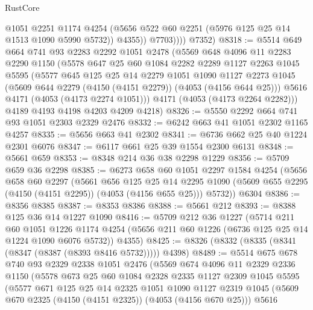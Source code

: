 \begin{lexlean}{RustCore}
\begin{coremodule}
                  @1051
                  @2251
                  @1174
                  @4254
                  (@5656 @522 @60 @2251 (@5976 @125 @25 @14 @1513 @1090 @5990 @5732))
                  @4355))
              @7703))))
      @7352)
@8318 := @5514
    @649
    @664
    @741
    @93
    @2283
    @2292
    @1051
    @2478
    (@5569
      @648
      @4096
      @11
      @2283
      @2290
      @1150
      (@5578
        @647
        @25
        @60
        @1084
        @2282
        @2289
        @1127
        @2263
        @1045
        @5595
        (@5577
          @645
          @125
          @25
          @14
          @2279
          @1051
          @1090
          @1127
          @2273
          @1045
          (@5609 @644 @2279 (@4150 (@4151 @2279)) (@4053 (@4156 @644 @25)))
          @5616
          @4171
          (@4053 (@4173 @2274 @1051)))
        @4171
        (@4053 (@4173 @2264 @2282)))
      @4189
      @4193
      @4198
      @4203
      @4209
      @4218)
@8326 := @5550 @2292 @664 @741 @93 @1051 @2303 @2329 @2476
@8332 := @6242 @663 @41 @1051 @2302 @1165 @4257
@8335 := @5656 @663 @41 @2302
@8341 := @6736 @662 @25 @40 @1224 @2301 @6076
@8347 := @6117 @661 @25 @39 @1554 @2300 @6131
@8348 := @5661 @659
@8353 := @8348 @214 @36 @38 @2298 @1229
@8356 := @5709 @659 @36 @2298
@8385 := @6273
    @658
    @60
    @1051
    @2297
    @1584
    @4254
    (@5656
      @658
      @60
      @2297
      (@5661
        @656
        @125
        @25
        @14
        @2295
        @1090
        (@5609 @655 @2295 (@4150 (@4151 @2295)) (@4053 (@4156 @655 @25)))
        @5732))
    @6304
@8386 := @8356 @8385
@8387 := @8353 @8386
@8388 := @5661 @212
@8393 := @8388 @125 @36 @14 @1227 @1090
@8416 := @5709
    @212
    @36
    @1227
    (@5714
      @211
      @60
      @1051
      @1226
      @1174
      @4254
      (@5656 @211 @60 @1226 (@6736 @125 @25 @14 @1224 @1090 @6076 @5732))
      @4355)
@8425 := @8326 (@8332 (@8335 (@8341 (@8347 (@8387 (@8393 @8416 @5732))))) @4398)
@8489 := @5514
    @675
    @678
    @740
    @93
    @2329
    @2338
    @1051
    @2476
    (@5569
      @674
      @4096
      @11
      @2329
      @2336
      @1150
      (@5578
        @673
        @25
        @60
        @1084
        @2328
        @2335
        @1127
        @2309
        @1045
        @5595
        (@5577
          @671
          @125
          @25
          @14
          @2325
          @1051
          @1090
          @1127
          @2319
          @1045
          (@5609 @670 @2325 (@4150 (@4151 @2325)) (@4053 (@4156 @670 @25)))
          @5616

\end{coremodule}
\end{lexlean}
